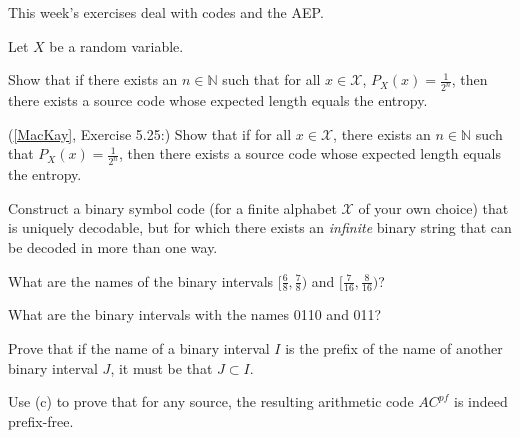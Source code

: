 \documentclass[a4paper,10pt,landscape,twocolumn]{scrartcl}
\begin{document}
\practiceproblems

{\sffamily\noindent
This week's exercises deal with codes and the AEP. \practiceinstructions
}

\begin{exercise}
Let $X$ be a random variable.
	\begin{subex}
	Show that if there exists an $n \in \mathbb{N}$ such that for all $x \in \mathcal{X}$, $P_X(x) = \frac{1}{2^n}$, then there exists a source code whose expected length equals the entropy.
	\end{subex}
	\begin{subex}
	(\href{http://www.inference.phy.cam.ac.uk/mackay/itila/book.html}{[MacKay]}, Exercise 5.25:) Show that if for all $x \in \mathcal{X}$, there exists an $n \in \mathbb{N}$ such that $P_X(x) = \frac{1}{2^n}$, then there exists a source code whose expected length equals the entropy.
	\end{subex}
\end{exercise}

\begin{bonusexercise}
Construct a binary symbol code (for a finite alphabet $\mathcal{X}$ of your own choice) that is uniquely decodable, but for which there exists an \emph{infinite} binary string that can be decoded in more than one way.
\end{bonusexercise}




\begin{exercise}
	\begin{subex}
	What are the names of the binary intervals $[\frac{6}{8},\frac{7}{8})$ and $[\frac{7}{16},\frac{8}{16})$?
	\end{subex}
	\begin{subex}
	What are the binary intervals with the names 0110 and 011?
	\end{subex}
	\begin{subex}
	Prove that if the name of a binary interval $I$ is the prefix of the name of another binary interval $J$, it must be that $J \subset I$.
	\end{subex}
	\begin{subex}
	Use (c) to prove that for any source, the resulting arithmetic code $AC^{pf}$ is indeed prefix-free.
	\end{subex}
\end{exercise}
\end{document}
